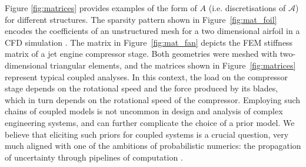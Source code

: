 \documentclass[twoside]{article}
\begin{document}
		Figure \ref{fig:matrices} provides examples of the form of $A$ (i.e. discretisations of $\mathcal{A}$) for different structures. The sparsity pattern shown in Figure~\ref{fig:mat_foil} encodes the coefficients of an unstructured mesh for a two dimensional airfoil in a CFD simulation \cite{Davis:2011}. The matrix in Figure~\ref{fig:mat_fan} depicts the FEM stiffness matrix of a jet engine compressor stage. Both geometries were meshed with two-dimensional triangular elements, and the matrices shown in Figure~\ref{fig:matrices} represent typical coupled analyses. In this context, the load on the compressor stage depends on the rotational speed and the force produced by its blades, which in turn depends on the rotational speed of the compressor. 
		Employing such chains of coupled models is not uncommon in design and analysis of complex engineering systems, and can further complicate the choice of a prior model. We believe that eliciting such priors for coupled systems is a crucial question, very much aligned with one of the ambitions of probabilistic numerics: the propagation of uncertainty through pipelines of computation \cite{PN15}.
\end{document}
